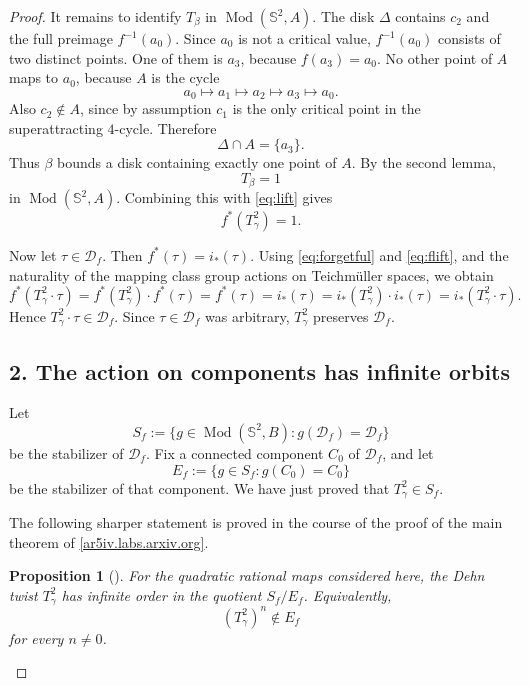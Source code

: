 \documentclass[11pt]{article}
\newtheorem{proposition}{Proposition}
\theoremstyle{remark}
\DeclareMathOperator{\Mod}{Mod}
\begin{document}
\begin{proof}
It remains to identify \(T_\beta\) in \(\Mod(\mathbb{S}^2,A)\). The disk \(\Delta\) contains
\(c_2\) and the full preimage \(f^{-1}(a_0)\). Since \(a_0\) is not a critical value,
\(f^{-1}(a_0)\) consists of two distinct points. One of them is \(a_3\), because
\(f(a_3)=a_0\). No other point of \(A\) maps to \(a_0\), because \(A\) is the cycle
\[
a_0\mapsto a_1\mapsto a_2\mapsto a_3\mapsto a_0.
\]
Also \(c_2\notin A\), since by assumption \(c_1\) is the only critical point in the
superattracting \(4\)-cycle. Therefore
\[
\Delta\cap A=\{a_3\}.
\]
Thus \(\beta\) bounds a disk containing exactly one point of \(A\). By the second lemma,
\[
T_\beta=1
\]
in \(\Mod(\mathbb{S}^2,A)\). Combining this with \eqref{eq:lift} gives
\begin{equation}
f^*(T_\gamma^2)=1. \label{eq:flift}
\end{equation}

Now let \(\tau\in\mathcal D_f\). Then \(f^*(\tau)=i_*(\tau)\). Using \eqref{eq:forgetful}
and \eqref{eq:flift}, and the naturality of the mapping class group actions on Teichm\"uller
spaces, we obtain
\[
f^*(T_\gamma^2\cdot \tau)
=
f^*(T_\gamma^2)\cdot f^*(\tau)
=
f^*(\tau)
=
i_*(\tau)
=
i_*(T_\gamma^2)\cdot i_*(\tau)
=
i_*(T_\gamma^2\cdot \tau).
\]
Hence \(T_\gamma^2\cdot\tau\in\mathcal D_f\). Since \(\tau\in\mathcal D_f\) was arbitrary,
\(T_\gamma^2\) preserves \(\mathcal D_f\).

\subsection*{2. The action on components has infinite orbits}

Let
\[
S_f:=\{g\in \Mod(\mathbb{S}^2,B): g(\mathcal D_f)=\mathcal D_f\}
\]
be the stabilizer of \(\mathcal D_f\). Fix a connected component \(C_0\) of
\(\mathcal D_f\), and let
\[
E_f:=\{g\in S_f: g(C_0)=C_0\}
\]
be the stabilizer of that component. We have just proved that \(T_\gamma^2\in S_f\).

The following sharper statement is proved in the course of the proof of the main theorem of
\href{https://ar5iv.labs.arxiv.org/html/1602.07378}{[ar5iv.labs.arxiv.org]}.

\begin{proposition}[{\cite[proof of Theorem 1.3]{disconnected}}]
For the quadratic rational maps considered here, the Dehn twist \(T_\gamma^2\) has infinite
order in the quotient \(S_f/E_f\). Equivalently,
\[
(T_\gamma^2)^n\notin E_f
\]
for every \(n\neq 0\).
\end{proposition}


\end{proof}
\end{document}
